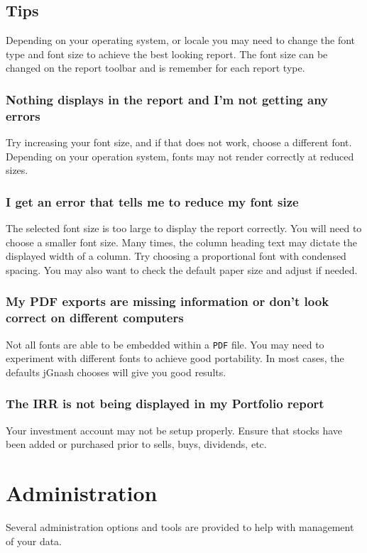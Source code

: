 \documentclass[letterpaper,12pt]{book}
\begin{document}
    \section{Tips}
    Depending on your operating system, or locale you may need to change the font type and font size to achieve
    the best looking report.
    The font size can be changed on the report toolbar and is remember for each report type.

    \subsection{Nothing displays in the report and I'm not getting any errors}
    Try increasing your font size, and if that does not work, choose a different font.
    Depending on your operation system, fonts may not render correctly at reduced sizes.

    \subsection{I get an error that tells me to reduce my font size}
    The selected font size is too large to display the report correctly.
    You will need to choose a smaller font size.
    Many times, the column heading text may dictate the displayed width of a column.
    Try choosing a proportional font with condensed spacing.
    You may also want to check the default paper size and adjust if needed.

    \subsection{My PDF exports are missing information or don't look correct on different computers}
    Not all fonts are able to be embedded within a \texttt{PDF} file.
    You may need to experiment with different fonts to achieve good portability.
    In most cases, the defaults jGnash chooses will give you good results.

    \subsection{The IRR is not being displayed in my Portfolio report}
    Your investment account may not be setup properly. Ensure that stocks have been added
    or purchased prior to sells, buys, dividends, etc.

    \chapter{Administration}
    Several administration options and tools are provided to help with management of your data.
\end{document}
